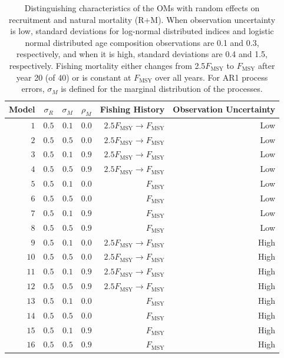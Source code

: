 \documentclass[
  12pt,
]{article}
\begin{document}
\begin{table}
\caption{Distinguishing characteristics of the OMs with random effects on recruitment and natural mortality (R+M). When observation uncertainty is low, standard deviations for log-normal distributed indices and logistic normal distributed age composition observations are 0.1 and 0.3, respectively, and when it is high, standard deviations are 0.4 and 1.5, respectively. Fishing mortality either changes from 2.5$F_{\text{MSY}}$ to $F_{\text{MSY}}$ after year 20 (of 40) or is constant at $F_{\text{MSY}}$ over all years. For AR1 process errors, $\sigma_M$ is defined for the marginal distribution of the processes.}\label{M_om_table}
{\begin{center}
\begin{tabular}{rrrrrr}
\hline\hline
\multicolumn{1}{c}{Model}&\multicolumn{1}{c}{$\sigma_R$}&\multicolumn{1}{c}{$\sigma_{M}$}&\multicolumn{1}{c}{$\rho_{M}$}&\multicolumn{1}{c}{Fishing History}&\multicolumn{1}{c}{Observation Uncertainty}\tabularnewline
\hline
$ 1$&$0.5$&$0.1$&$0.0$&$2.5 F_{\text{MSY}} \rightarrow F_{\text{MSY}}$&Low\tabularnewline
$ 2$&$0.5$&$0.5$&$0.0$&$2.5 F_{\text{MSY}} \rightarrow F_{\text{MSY}}$&Low\tabularnewline
$ 3$&$0.5$&$0.1$&$0.9$&$2.5 F_{\text{MSY}} \rightarrow F_{\text{MSY}}$&Low\tabularnewline
$ 4$&$0.5$&$0.5$&$0.9$&$2.5 F_{\text{MSY}} \rightarrow F_{\text{MSY}}$&Low\tabularnewline
$ 5$&$0.5$&$0.1$&$0.0$&$F_{\text{MSY}}$&Low\tabularnewline
$ 6$&$0.5$&$0.5$&$0.0$&$F_{\text{MSY}}$&Low\tabularnewline
$ 7$&$0.5$&$0.1$&$0.9$&$F_{\text{MSY}}$&Low\tabularnewline
$ 8$&$0.5$&$0.5$&$0.9$&$F_{\text{MSY}}$&Low\tabularnewline
$ 9$&$0.5$&$0.1$&$0.0$&$2.5 F_{\text{MSY}} \rightarrow F_{\text{MSY}}$&High\tabularnewline
$10$&$0.5$&$0.5$&$0.0$&$2.5 F_{\text{MSY}} \rightarrow F_{\text{MSY}}$&High\tabularnewline
$11$&$0.5$&$0.1$&$0.9$&$2.5 F_{\text{MSY}} \rightarrow F_{\text{MSY}}$&High\tabularnewline
$12$&$0.5$&$0.5$&$0.9$&$2.5 F_{\text{MSY}} \rightarrow F_{\text{MSY}}$&High\tabularnewline
$13$&$0.5$&$0.1$&$0.0$&$F_{\text{MSY}}$&High\tabularnewline
$14$&$0.5$&$0.5$&$0.0$&$F_{\text{MSY}}$&High\tabularnewline
$15$&$0.5$&$0.1$&$0.9$&$F_{\text{MSY}}$&High\tabularnewline
$16$&$0.5$&$0.5$&$0.9$&$F_{\text{MSY}}$&High\tabularnewline
\hline
\end{tabular}\end{center}
}
\end{table}
\end{document}
